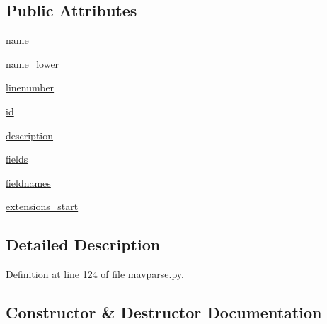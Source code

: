 \subsection*{Public Attributes}
\begin{DoxyCompactItemize}
\item 
\mbox{\hyperlink{classpymavlink_1_1generator_1_1mavparse_1_1MAVType_a823ea7c0a71ae5120a694964e2f6148f}{name}}
\item 
\mbox{\hyperlink{classpymavlink_1_1generator_1_1mavparse_1_1MAVType_a2c3404ee30d62d976b474f797c3ebae1}{name\+\_\+lower}}
\item 
\mbox{\hyperlink{classpymavlink_1_1generator_1_1mavparse_1_1MAVType_aeb0811086c27087eaf1566f7f71b6d3a}{linenumber}}
\item 
\mbox{\hyperlink{classpymavlink_1_1generator_1_1mavparse_1_1MAVType_a80483a5197aff1cf439f9830b3e87e95}{id}}
\item 
\mbox{\hyperlink{classpymavlink_1_1generator_1_1mavparse_1_1MAVType_a17b35e45a6c81c122cd9b2bad5d9d915}{description}}
\item 
\mbox{\hyperlink{classpymavlink_1_1generator_1_1mavparse_1_1MAVType_af0c7ae3c03fb8b6c0eccf4b69dec06de}{fields}}
\item 
\mbox{\hyperlink{classpymavlink_1_1generator_1_1mavparse_1_1MAVType_a1f11092ca7330da7ffe5a75d3b97b3de}{fieldnames}}
\item 
\mbox{\hyperlink{classpymavlink_1_1generator_1_1mavparse_1_1MAVType_a112964b6b6b1d78f8ed99b78a4d26438}{extensions\+\_\+start}}
\end{DoxyCompactItemize}


\subsection{Detailed Description}


Definition at line 124 of file mavparse.\+py.



\subsection{Constructor \& Destructor Documentation}
\mbox{\label{classpymavlink_1_1generator_1_1mavparse_1_1MAVType_a2b349bf03d33eb679e249919fb04daef}} 
